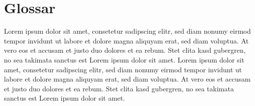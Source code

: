 \documentclass[12pt,oneside,a4paper,bibtotoc,liststotoc,pointlessnumbers]{scrartcl}
\begin{document}
\section{Glossar}
Lorem ipsum dolor sit amet, consetetur sadipscing elitr, sed diam nonumy eirmod tempor invidunt ut labore et dolore magna aliquyam erat, sed diam voluptua. At vero eos et accusam et justo duo dolores et ea rebum. Stet clita kasd gubergren, no sea takimata sanctus est Lorem ipsum dolor sit amet. Lorem ipsum dolor sit amet, consetetur sadipscing elitr, sed diam nonumy eirmod tempor invidunt ut labore et dolore magna aliquyam erat, sed diam voluptua. At vero eos et accusam et justo duo dolores et ea rebum. Stet clita kasd gubergren, no sea takimata sanctus est Lorem ipsum dolor sit amet.

\newpage

\listoffigures

\newpage

\listoftables



\newpage
\end{document}
